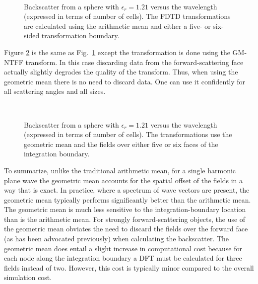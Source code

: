 \begin{figure}
\centering
{}\\
\caption{Backscatter from a sphere with $\epsilon_r=1.21$ versus the
wavelength (expressed in terms of number of cells).  The FDTD
transformations are calculated using the arithmetic mean and either
a five- or six-sided transformation boundary.}
\label{fig:sphereBackscatterArith}
\end{figure}

Figure \ref{fig:sphereBackscatterGeom} is the same as Fig.\
\ref{fig:sphereBackscatterArith} except the transformation is done
using the GM-NTFF transform.  In this case discarding data from the
forward-scattering face actually slightly degrades the quality of the
transform.  Thus, when using the geometric mean there is no need to
discard data.  One can use it confidently for all scattering angles
and all sizes.

\begin{figure}
\centering
{}\\
\caption{Backscatter from a sphere with $\epsilon_r=1.21$ versus the
wavelength (expressed in terms of number of cells).  The
transformations use the geometric mean and the fields over either five
or six faces of the integration boundary.}
\label{fig:sphereBackscatterGeom}
\end{figure}

To summarize, unlike the traditional arithmetic mean, for a single
harmonic plane wave the geometric mean accounts for the spatial offset
of the fields in a way that is exact.  In practice, where a spectrum
of wave vectors are present, the geometric mean typically performs
significantly better than the arithmetic mean.  The geometric mean is
much less sensitive to the integration-boundary location than is the
arithmetic mean.  For strongly forward-scattering objects, the use of
the geometric mean obviates the need to discard the fields over the
forward face (as has been advocated previously) when calculating the
backscatter.  The geometric mean does entail a slight increase in
computational cost because for each node along the integration
boundary a DFT must be calculated for three fields instead of two.
However, this cost is typically minor compared to the overall
simulation cost.

